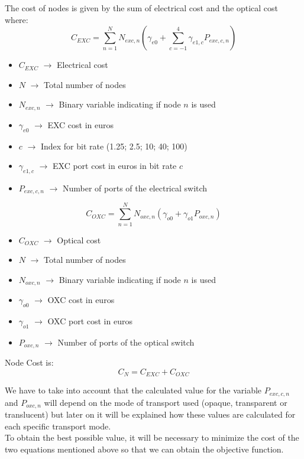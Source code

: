 The cost of nodes is given by the sum of electrical cost and the optical cost where:\\

\begin{equation}
C_{EXC} = \sum_{n=1}^{N} N_{exc,n} ( \gamma_{e0} + \sum_{c=-1}^4 \gamma_{e1,c} P_{exc,c,n} )
\label{Capex_Node_EXC}
\end{equation}


\begin{itemize}
\item{$C_{EXC}$			$\rightarrow$	Electrical cost}
\item{$N$				$\rightarrow$	Total number of nodes}
\item{$N_{exc,n}$		$\rightarrow$	Binary variable indicating if node $n$ is used}
\item{$\gamma_{e0}$ 	$\rightarrow$	EXC cost in euros}
\item{$c$               $\rightarrow$   Index for bit rate (1.25; 2.5; 10; 40; 100)}
\item{$\gamma_{e1,c}$	$\rightarrow$	EXC port cost in euros in bit rate $c$}
\item{$P_{exc,c,n}$	    $\rightarrow$	Number of ports of the electrical switch}
\end{itemize}


\begin{equation}
C_{OXC} = \sum_{n=1}^{N} N_{oxc,n} ( \gamma_{o0} + \gamma_{o1} P_{oxc,n} )
\label{Capex_Node_OXC}
\end{equation}


\begin{itemize}
\item{$C_{OXC}$			$\rightarrow$	Optical cost}
\item{$N$				$\rightarrow$	Total number of nodes}
\item{$N_{oxc,n}$		$\rightarrow$	Binary variable indicating if node $n$ is used}
\item{$\gamma_{o0}$ 	$\rightarrow$	OXC cost in euros}
\item{$\gamma_{o1}$ 	$\rightarrow$	OXC port cost in euros }
\item{$P_{oxc,n}$	    $\rightarrow$	Number of ports of the optical switch}
\end{itemize}

Node Cost is:\\
\begin{equation}
C_N = C_{EXC} + C_{OXC}
\label{Capex_Node}
\end{equation}

\vspace{10pt}
We have to take into account that the calculated value for the variable $P_{exc,c,n}$ and $P_{oxc,n}$ will depend on the mode of transport used (opaque, transparent or translucent) but later on it will be explained how these values are calculated for each specific transport mode.\\
To obtain the best possible value, it will be necessary to minimize the cost of the two equations mentioned above so that we can obtain the objective function.


